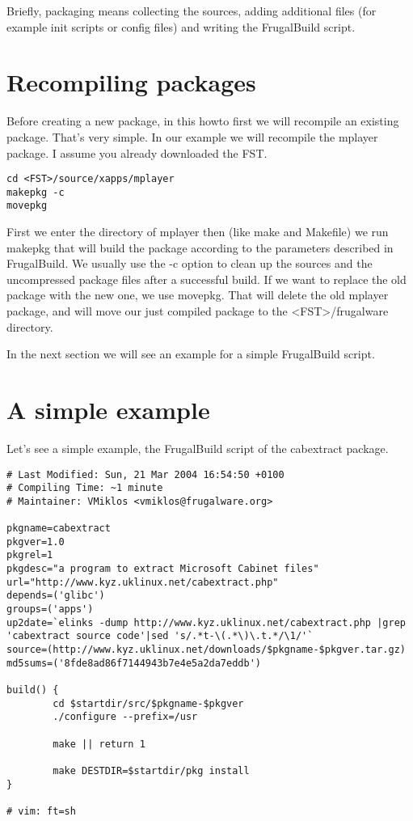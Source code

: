 Briefly, packaging means collecting the sources, adding additional files (for example init scripts or config files) and writing the FrugalBuild script.

\section{Recompiling packages}

Before creating a new package, in this howto first we will recompile an existing package. That's very simple. In our example we will recompile the mplayer package. I assume you already downloaded the FST.

\begin {verbatim}
cd <FST>/source/xapps/mplayer
makepkg -c
movepkg
\end{verbatim}

First we enter the directory of mplayer then (like make and Makefile) we run makepkg that will build the package according to the parameters described in FrugalBuild. We usually use the -c option to clean up the sources and the uncompressed package files after a successful build. If we want to replace the old package with the new one, we use movepkg. That will delete the old mplayer package, and will move our just compiled package to the <FST>/frugalware directory.

In the next section we will see an example for a simple FrugalBuild script.

\section{A simple example}
Let's see a simple example, the FrugalBuild script of the cabextract package.
\begin{verbatim}
# Last Modified: Sun, 21 Mar 2004 16:54:50 +0100
# Compiling Time: ~1 minute
# Maintainer: VMiklos <vmiklos@frugalware.org>

pkgname=cabextract
pkgver=1.0
pkgrel=1
pkgdesc="a program to extract Microsoft Cabinet files"
url="http://www.kyz.uklinux.net/cabextract.php"
depends=('glibc')
groups=('apps')
up2date=`elinks -dump http://www.kyz.uklinux.net/cabextract.php |grep 'cabextract source code'|sed 's/.*t-\(.*\)\.t.*/\1/'`
source=(http://www.kyz.uklinux.net/downloads/$pkgname-$pkgver.tar.gz)
md5sums=('8fde8ad86f7144943b7e4e5a2da7eddb')

build() {
        cd $startdir/src/$pkgname-$pkgver
        ./configure --prefix=/usr
	
        make || return 1
	
        make DESTDIR=$startdir/pkg install
}

# vim: ft=sh
\end{verbatim}

